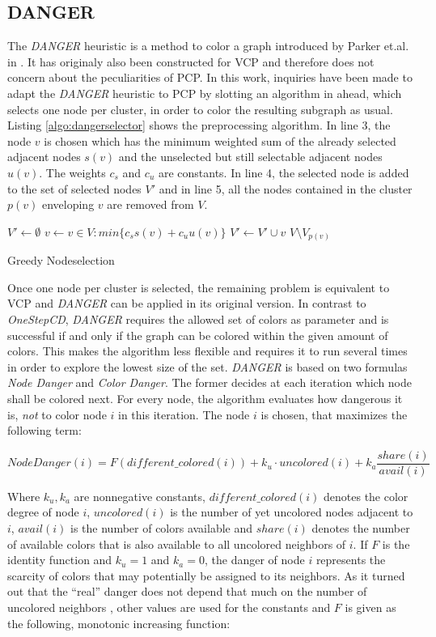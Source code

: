 \subsection{DANGER}
The \textit{DANGER} heuristic is a method to color a graph introduced by Parker et.al. in \cite{glover-96}. It has originaly also been constructed for VCP and therefore does not concern about the peculiarities of PCP. In this work, inquiries have been made to adapt the \textit{DANGER} heuristic to PCP by slotting an algorithm in ahead, which selects one node per cluster, in order to color the resulting subgraph as usual.\\ 
Listing \ref{algo:dangerselector} shows the preprocessing algorithm. In line 3, the node $v$ is chosen which has the minimum weighted sum of the already selected adjacent nodes $s(v)$ and the unselected but still selectable adjacent nodes $u(v)$. The weights $c_s$ and $c_u$ are constants. In line 4, the selected node is added to the set of selected nodes $V'$ and in line 5, all the nodes contained in the cluster $p(v)$ enveloping $v$ are removed from $V$. 
\begin{algorithm}[h]
$V' \gets \emptyset$\;
 {
        $v \gets v\in V : min\{ c_s s(v) + c_u u(v) \}$\;
        $V' \gets V' \cup v$\;
        $V \setminus V_{p(v)}$\;
}
\caption{Greedy Nodeselection}
\label{algo:dangerselector}
\end{algorithm}


Once one node per cluster is selected, the remaining problem is equivalent to VCP and \textit{DANGER} can be applied in its original version. In contrast to \textit{OneStepCD}, \textit{DANGER} requires the allowed set of colors as parameter and is successful if and only if the graph can be colored within the given amount of colors. This makes the algorithm less flexible and requires it to run several times in order to explore the lowest size of the set. \textit{DANGER} is based on two formulas \textit{Node Danger} and \textit{Color Danger}.
The former decides at each iteration which node shall be colored next. For every node, the algorithm evaluates how dangerous it is, \textit{not} to color node $i$ in this iteration. The node $i$ is chosen, that maximizes the following term:

$$ \mathit{NodeDanger}(i) =  F(\mathit{different\_colored}(i)) + k_u \cdot \mathit{uncolored}(i) + k_a \frac{\mathit{share}(i)}{\mathit{avail}(i)} $$

Where $k_u, k_a$ are nonnegative constants, $\mathit{different\_colored}(i)$ denotes the color degree of node $i$, $\mathit{uncolored}(i)$ is the number of yet uncolored nodes adjacent to $i$, $\mathit{avail}(i)$ is the number of colors available and $\mathit{share}(i)$ denotes the number of available colors that is also available to all uncolored neighbors of $i$. If $F$ is the identity function and $k_u=1$ and $k_a=0$, the danger of node $i$ represents the scarcity of colors that may potentially be assigned to its neighbors. As it turned out that the ``real'' danger does not depend that much on the number of uncolored neighbors \cite{glover-96}, other values are used for the constants and $F$ is given as the following, monotonic increasing function:

